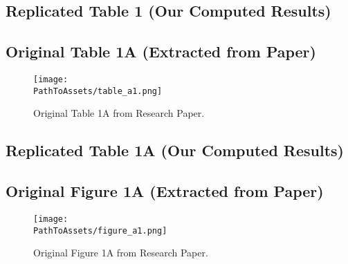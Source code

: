 \documentclass{article}
\begin{document}

\subsection{Replicated Table 1 (Our Computed Results)}


\subsection{Original Table 1A (Extracted from Paper)}
\begin{figure}[H]
    \centering
    \texttt{[image: \\PathToAssets/table\_a1.png]}
    \caption{Original Table 1A from Research Paper.}
\end{figure}

\subsection{Replicated Table 1A (Our Computed Results)}


\subsection{Original Figure 1A (Extracted from Paper)}
\begin{figure}[H]
    \centering
    \texttt{[image: \\PathToAssets/figure\_a1.png]}
    \caption{Original Figure 1A from Research Paper.}
\end{figure}
\end{document}

